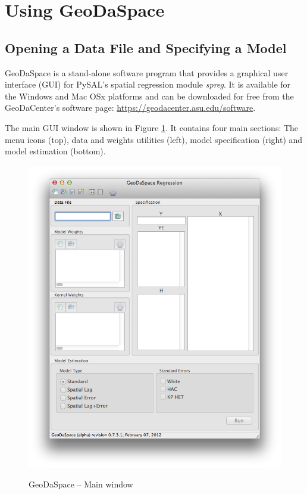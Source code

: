 \documentclass{article}
\begin{document}
\newpage
\section{Using GeoDaSpace}
\label{s:GS}
\subsection{Opening a Data File and Specifying a Model}

GeoDaSpace is a stand-alone software program that provides a graphical user interface (GUI) for PySAL's spatial regression module  \emph{spreg}. It is available for the Windows and Mac OSx platforms and can be downloaded for free from the GeoDaCenter's software page: \url{https://geodacenter.asu.edu/software}. 

The main GUI window is shown in Figure \ref{f:gui}. It contains four main sections: The menu icons (top), data and weights utilities (left), model specification (right) and model estimation (bottom). 

\begin{figure}[htb]
\begin{center}
\includegraphics[width=0.8\linewidth]{GUI.png}\\
\caption{GeoDaSpace -- Main window}
\label{f:gui}
\end{center}
\end{figure}
\end{document}
